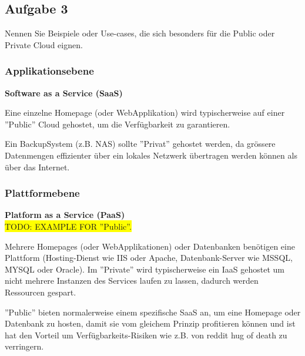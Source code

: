 \documentclass[11pt,titlepage]{article}
\newenvironment{shadedquotation}
 {\begin{shaded*}
  \quoting[leftmargin=0pt, vskip=0pt]
 }
 {\endquoting
 \end{shaded*}
}
\begin{document}
  \par\medskip

\subsection{Aufgabe 3}
\label{sec:Aufgabe-3}

\begin{shadedquotation}
  Nennen Sie Beispiele oder Use-cases, die sich besonders für die Public oder Private Cloud eignen.
\end{shadedquotation}

\subsubsection{Applikationsebene}
\label{subsec:Aufgabe-3_Applikationsebene}
{\large\bf Software as a Service (SaaS)} \\\medskip

Eine einzelne Homepage (oder WebApplikation) wird typischerweise auf einer ''Public'' Cloud gehostet, um die Verfügbarkeit zu garantieren.
\medskip

Ein BackupSystem (z.B. NAS) sollte ''Privat'' gehostet werden, da grössere Datenmengen effizienter über ein lokales Netzwerk übertragen werden können als über das Internet.

\subsubsection{Plattformebene}
\label{subsec:Aufgabe-3_Plattformebene}
{\large\bf Platform as a Service (PaaS)} \\\medskip
\colorbox{yellow}{TODO: EXAMPLE FOR ''Public''.}
\par\medskip

Mehrere Homepages (oder WebApplikationen) oder Datenbanken benötigen eine Plattform (Hosting-Dienst wie IIS oder Apache, Datenbank-Server wie MSSQL, MYSQL oder Oracle).
Im ''Private'' wird typischerweise ein IaaS gehostet um nicht mehrere Instanzen des Services laufen zu lassen, dadurch werden Ressourcen gespart.

''Public'' bieten normalerweise einem spezifische SaaS an, um eine Homepage oder Datenbank zu hosten, damit sie vom gleichem Prinzip profitieren können und ist hat den Vorteil um Verfügbarkeits-Risiken wie z.B. von reddit hug of death zu verringern.
\end{document}
